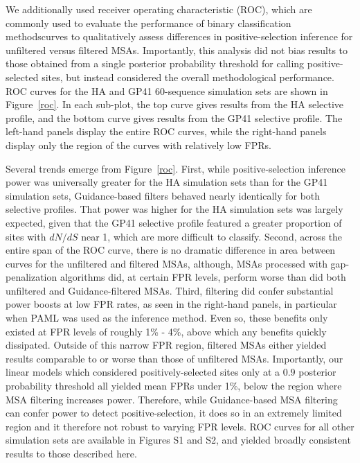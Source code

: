 \documentclass[11pt]{article}
\begin{document}
We additionally used receiver operating characteristic (ROC), which are commonly used to evaluate the performance of binary classification methodscurves to qualitatively assess differences in positive-selection inference for unfiltered versus filtered MSAs. Importantly, this analysis did not bias results to those obtained from a single posterior probability threshold for calling positive-selected sites, but instead considered the overall methodological performance. ROC curves for the HA and GP41 60-sequence simulation sets are shown in Figure~\ref{roc}. In each sub-plot, the top curve gives results from the HA selective profile, and the bottom curve gives results from the GP41 selective profile. The left-hand panels display the entire ROC curves, while the right-hand panels display only the region of the curves with relatively low FPRs. 

Several trends emerge from Figure~\ref{roc}. First, while positive-selection inference power was universally greater for the HA simulation sets than for the GP41 simulation sets, Guidance-based filters behaved nearly identically for both selective profiles. That power was higher for the HA simulation sets was largely expected, given that the GP41 selective profile featured a greater proportion of sites with $dN/dS$ near 1, which are more difficult to classify. Second, across the entire span of the ROC curve, there is no dramatic difference in area between curves for the unfiltered and filtered MSAs, although, MSAs processed with gap-penalization algorithms did, at certain FPR levels, perform worse than did both unfiltered and Guidance-filtered MSAs. Third, filtering did confer substantial power boosts at low FPR rates, as seen in the right-hand panels, in particular when PAML was used as the inference method. Even so, these benefits only existed at FPR levels of roughly 1\% - 4\%, above which any benefits quickly dissipated. Outside of this narrow FPR region, filtered MSAs either yielded results comparable to or worse than those of unfiltered MSAs. Importantly, our linear models which considered positively-selected sites only at a $0.9$ posterior probability threshold all yielded mean FPRs under 1\%, below the region where MSA filtering increases power. Therefore, while Guidance-based MSA filtering can confer power to detect positive-selection, it does so in an extremely limited region and it therefore not robust to varying FPR levels. ROC curves for all other simulation sets are available in Figures S1 and S2, and yielded broadly consistent results to those described here.
\end{document}
